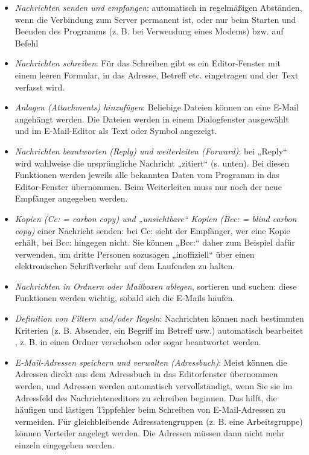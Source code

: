 \documentclass[]{book}
\providecommand{\tightlist}{%
  \setlength{\itemsep}{0pt}\setlength{\parskip}{0pt}}
\theoremstyle{definition}
\theoremstyle{definition}
\theoremstyle{definition}
\theoremstyle{remark}
\begin{document}
\begin{itemize}
\tightlist
\item
  \emph{Nachrichten senden und empfangen}: automatisch in regelmäßigen
  Abständen, wenn die Verbindung zum Server permanent ist, oder nur beim
  Starten und Beenden des Programms (z. B. bei Verwendung eines Modems)
  bzw. auf Befehl
\item
  \emph{Nachrichten schreiben}: Für das Schreiben gibt es ein
  Editor-Fenster mit einem leeren Formular, in das Adresse, Betreff etc.
  eingetragen und der Text verfasst wird.
\item
  \emph{Anlagen (Attachments) hinzufügen}: Beliebige Dateien können an
  eine E-Mail angehängt werden. Die Dateien werden in einem
  Dialogfenster ausgewählt und im E-Mail-Editor als Text oder Symbol
  angezeigt.
\item
  \emph{Nachrichten beantworten (Reply) und weiterleiten (Forward)}: bei
  „Reply`` wird wahlweise die ursprüngliche Nachricht „zitiert`` (s.
  unten). Bei diesen Funktionen werden jeweils alle bekannten Daten vom
  Programm in das Editor-Fenster übernommen. Beim Weiterleiten muss nur
  noch der neue Empfänger angegeben werden.
\item
  \emph{Kopien (Cc: = carbon copy) und „unsichtbare`` Kopien (Bcc: =
  blind carbon copy)} einer Nachricht senden: bei Cc: sieht der
  Empfänger, wer eine Kopie erhält, bei Bcc: hingegen nicht. Sie können
  „Bcc:`` daher zum Beispiel dafür verwenden, um dritte Personen
  sozusagen „inoffiziell`` über einen elektronischen Schriftverkehr auf
  dem Laufenden zu halten.
\item
  \emph{Nachrichten in Ordnern oder Mailboxen ablegen}, sortieren und
  suchen: diese Funktionen werden wichtig, sobald sich die E-Mails
  häufen.
\item
  \emph{Definition von Filtern und/oder Regeln}: Nachrichten können nach
  bestimmten Kriterien (z. B. Absender, ein Begriff im Betreff usw.)
  automatisch bearbeitet , z. B. in einen Ordner verschoben oder sogar
  beantwortet werden.
\item
  \emph{E-Mail-Adressen speichern und verwalten (Adressbuch)}: Meist
  können die Adressen direkt aus dem Adressbuch in das Editorfenster
  übernommen werden, und Adressen werden automatisch vervollständigt,
  wenn Sie sie im Adressfeld des Nachrichteneditors zu schreiben
  beginnen. Das hilft, die häufigen und lästigen Tippfehler beim
  Schreiben von E-Mail-Adressen zu vermeiden. Für gleichbleibende
  Adressatengruppen (z. B. eine Arbeitsgruppe) können Verteiler angelegt
  werden. Die Adressen müssen dann nicht mehr einzeln eingegeben werden.
\end{itemize}
\end{document}
